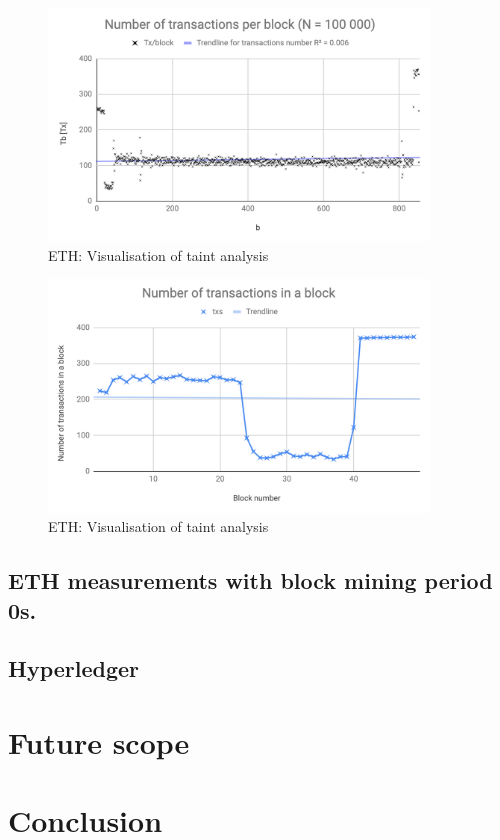 \documentclass[12pt]{article}
\begin{document}
\begin{figure}[h]
    \centering
    \includegraphics[width=0.9\textwidth]{img/txmed.png}
    \caption{ETH: Visualisation of taint analysis}
    \label{fig:txbig}
\end{figure}

\begin{figure}[h]
    \centering
    \includegraphics[width=0.9\textwidth]{img/TxNumperBlockSmall.png}
    \caption{ETH: Visualisation of taint analysis}
    \label{fig:txsmall}
\end{figure}

\subsection{ETH measurements with block mining period 0s.}
\subsection{Hyperledger}

\section{Future scope}

\section{Conclusion}


\newpage


\end{document}
